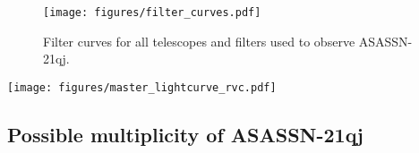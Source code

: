 \documentclass{aa}
\newcommand{\asas}{ASASSN-21qj}
\begin{document}
\begin{figure}
   \begin{centering}
   \texttt{[image: figures/filter\_curves.pdf]}
      \caption{Filter curves for all telescopes and filters used to observe \asas.}
      \label{fig:allfilters}
      \end{centering}
\end{figure}


\begin{figure*}
   \begin{centering}
   \texttt{[image: figures/master\_lightcurve\_rvc.pdf]}
      \caption{The light curve of ASASSN-21qj from several different photometric surveys. Three different light curves have been generated by combining data sets with similar passbands for each light curve. The light curves are offset vertically for clarity. The absorption increases from red wavelengths to blue wavelengths.
              }
        \label{fig:eclipse_overview}
    \end{centering}
\end{figure*}

\subsection{Possible multiplicity of \asas} 
\label{subsec:companion}
\end{document}
